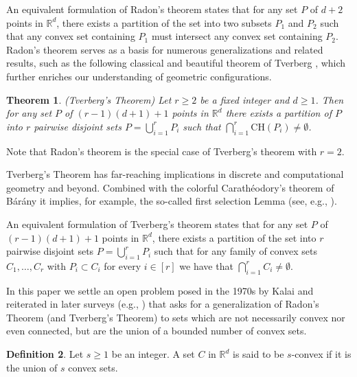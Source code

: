\documentclass[11pt]{article}
\def\Re{\mathbb R}
\theoremstyle{plain}
\newtheorem{theorem}{Theorem}[section]
\theoremstyle{definition}
\newtheorem{definition}[theorem]{Definition}
\theoremstyle{remark}
\begin{document}
An equivalent formulation of Radon's theorem
states that for any set $P$ of $d+2$ points in $\mathbb{R}^d$, there
exists a partition of the set into two subsets $P_1$ and $P_2$ such that
any convex set containing $P_1$ must intersect any convex set containing
$P_2$. 
Radon's theorem serves as a basis for numerous generalizations
and related results, such as the following classical and beautiful
theorem of Tverberg \cite{Tverberg1966}, which further enriches our
understanding of geometric configurations.

\begin{theorem}\label{Thm:Tverberg}(Tverberg's Theorem\cite{Tverberg1966})
Let $ r \geq 2$ be a fixed integer and $d \geq 1$. Then for any set $P$
of $(r-1)(d+1)+1$ points in $\Re^d$ there exists a partition of $P$
into $r$ pairwise disjoint sets $P = \bigcup_{i=1}^r P_i$ such that
$\bigcap_{i=1}^r \text{CH}(P_i) \neq \emptyset$.
\end{theorem}

Note that Radon's theorem is the special case of 
Tverberg's theorem with $r=2$.

Tverberg's Theorem has far-reaching implications in discrete and computational geometry and beyond.
Combined with the colorful Carath\'eodory's theorem of B{\'a}r{\' a}ny \cite{Barany82} it implies, for example, the so-called first selection Lemma (see, e.g., \cite{MATOUSEK}).

An equivalent formulation of Tverberg's theorem states that for any set
$P$ of $(r-1)(d+1)+1$ points in $\mathbb{R}^d$, there exists a partition
of the set into $r$ pairwise disjoint sets $P = \bigcup_{i=1}^r P_i$ such
that for any family of convex sets $C_1,\ldots,C_r$ with $P_i \subset C_i$
for every $i \in [r]$ we have that $\bigcap_{i=1}^r C_i \neq \emptyset$.

In this paper we settle an 
open problem posed in the 1970s by Kalai 
and reiterated in later surveys (e.g., \cite{BaranyKalai2022,Kalai-personal}) that asks for a generalization of Radon's Theorem (and Tverberg's Theorem) to sets which are not necessarily
convex nor even connected, but are the union of a bounded number of convex sets. 

\begin{definition}
    Let $s \geq 1$ be an integer. A set $C$ in $\Re^d$ 
is said to be $s$-convex if it is the union of $s$ convex sets. 
\end{definition}
\end{document}

